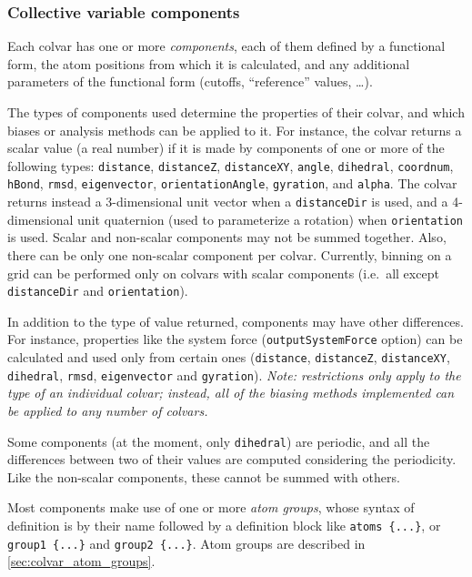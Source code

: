 \subsubsection{Collective variable components}
\label{sec:cvc}

Each colvar has one or more \emph{components}, each of them defined by
a functional form, the atom positions from which it is calculated, and
any additional parameters of the functional form (cutoffs,
``reference'' values, \ldots).

The types of components used determine the properties of their colvar,
and which biases or analysis methods can be applied to it.  For
instance, the colvar returns a scalar value (a real number) if it is
made by components of one or more of the following types:
\texttt{distance}, \texttt{distanceZ}, \texttt{distanceXY},
\texttt{angle}, \texttt{dihedral}, \texttt{coordnum}, \texttt{hBond},
\texttt{rmsd}, \texttt{eigenvector}, \texttt{orientationAngle},
\texttt{gyration}, and \texttt{alpha}.  The colvar returns instead a
3-dimensional unit vector when a \texttt{distanceDir} is used, and a
4-dimensional unit quaternion (used to parameterize a rotation) when
\texttt{orientation} is used.  Scalar and non-scalar components may
not be summed together.  Also, there can be only one non-scalar
component per colvar.  Currently, binning on a grid can be performed
only on colvars with scalar components (i.e.~all except
\texttt{distanceDir} and \texttt{orientation}).

In addition to the type of value returned, components may have other
differences.  For instance, properties like the system force
(\texttt{outputSystemForce} option) can be calculated and used only
from certain ones (\texttt{distance}, \texttt{distanceZ},
\texttt{distanceXY}, \texttt{dihedral}, \texttt{rmsd},
\texttt{eigenvector} and \texttt{gyration}).  \emph{Note: restrictions
  only apply to the type of an individual colvar; instead, all of the
  biasing methods implemented can be applied to any number of
  colvars.}

Some components (at the moment, only \texttt{dihedral}) are periodic,
and all the differences between two of their values are computed
considering the periodicity.  Like the non-scalar components, these
cannot be summed with others.

Most components make use of one or more \emph{atom groups}, whose
syntax of definition is by their name followed by a definition block
like \texttt{atoms~\{...\}}, or \texttt{group1~\{...\}} and
\texttt{group2~\{...\}}.  Atom groups are described in
\ref{sec:colvar_atom_groups}.

